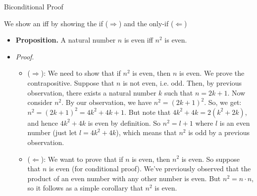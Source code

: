 \begin{frame}{Biconditional Proof}

We show an iff by showing the if ($\Rightarrow$) and the only-if ($\Leftarrow$)

\begin{itemize}

	\item \textbf{Proposition.} A natural number $n$ is even iff $n^2$ is even.

	\item \emph{Proof}.
					
					\begin{itemize}
					
						\item ($\Rightarrow$): We need to show that if $n^2$ is even, then $n$ is even. We prove the contrapositive. Suppose that $n$ is not even, i.e. odd. Then, by previous observation, there exists a natural number $k$ such that $n=2k+1$. Now consider $n^2$. By our observation, we have $n^2=(2k+1)^2$. So, we get: $n^2=(2k+1)^2=4k^2+4k+1$. But note that $4k^2+4k=2(k^2+2k)$, and hence $4k^2+4k$ is even by definition. So $n^2=l+1$ where $l$ is an even number (just let $l=4k^2+4k$), which means that $n^2$ is odd by a previous observation. 
						
						\item ($\Leftarrow$): We want to prove that if $n$ is even, then $n^2$ is even. So suppose that $n$ is even (for conditional proof). We've previously observed that the product of an even number with any other number is even. But $n^2=n\cdot n$, so it follows as a simple corollary that $n^2$ is even.
											
					\end{itemize}

\end{itemize}

\end{frame}

